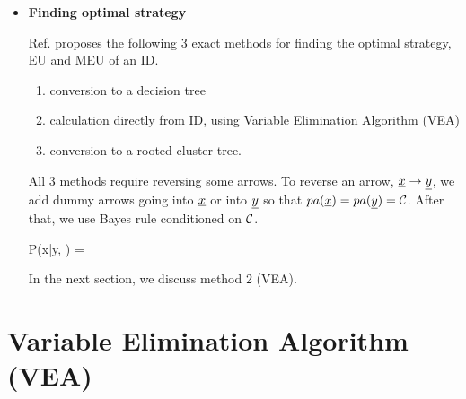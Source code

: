 \begin{itemize}
\item {\bf Finding optimal strategy }


Ref.\cite{sha-influ-diag} proposes the following 3 exact methods for
finding the optimal strategy, EU and MEU of an ID.
\begin{enumerate}
\item conversion to a decision
tree 
\item calculation directly from ID, using Variable
Elimination Algorithm (VEA)
\item conversion to a rooted cluster tree.
\end{enumerate}

All 3 methods require  reversing some arrows. To reverse
an arrow, ${\underline{x}}\rightarrow {\underline{y}}$, we add dummy arrows going into ${\underline{x}}$ or into
${\underline{y}}$ so that $pa({\underline{x}})=pa({\underline{y}})= {\cal C}$. After that, we use Bayes rule conditioned on ${\cal C}$.


\beq
P(x|y, \calc) = 
\eeq




In the next section,
we discuss method 2 (VEA).

\end{itemize}

\section{Variable Elimination Algorithm (VEA)}


